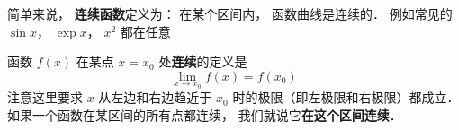 

简单来说， \textbf{连续函数}定义为： 在某个区间内， 函数曲线是连续的． 例如常见的 $\sin x$， $\exp x$， $x^2$ 都在任意


函数 $f(x)$ 在某点 $x = x_0$ 处\textbf{连续}的定义是
\begin{equation}
\lim_{x \to x_0} f(x) = f(x_0)
\end{equation}
注意这里要求 $x$ 从左边和右边趋近于 $x_0$ 时的极限（即左极限和右极限）都成立． 如果一个函数在某区间的所有点都连续， 我们就说它\textbf{在这个区间连续}．

